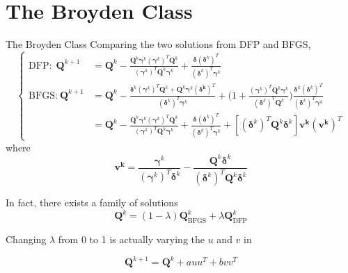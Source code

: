 \documentclass{beamer}
\begin{document}
\section{The Broyden Class}
\begin{frame}{The Broyden Class}
Comparing the two solutions from DFP and BFGS,
\begin{equation*}
\begin{cases}
    \textrm{DFP:}~~  \boldsymbol{Q}^{k+1}  &= \boldsymbol{Q}^k - 
    \frac{ \boldsymbol{Q}^k \boldsymbol{\gamma}^k (\boldsymbol{\gamma}^k)^T \boldsymbol{Q}^k }
    {(\boldsymbol{\gamma}^k)^T \boldsymbol{Q}^k \boldsymbol{\gamma}^k} 
    + \frac{\boldsymbol{\delta}(\boldsymbol{\delta}^k)^T}{(\boldsymbol{\delta}^k)^T \boldsymbol{\gamma}^k}\\

    \textrm{BFGS:}~     \boldsymbol{Q}^{k+1} &= \boldsymbol{Q}^k - 
    \frac{\boldsymbol{\delta}^k (\boldsymbol{\gamma}^k)^T \boldsymbol{Q}^k + \boldsymbol{Q}^k\boldsymbol{\gamma}^k (\boldsymbol{\delta^k})^T}
    {(\boldsymbol{\delta}^k)^T \boldsymbol{\gamma}^k} 
    + \bigg(1 + \frac{(\boldsymbol{\gamma}^k)^T \boldsymbol{Q}^k \boldsymbol{\gamma}^k}{(\boldsymbol{\delta}^k)^T \boldsymbol{Q}^k}\bigg)
    \frac{\boldsymbol{\delta}^k (\boldsymbol{\delta}^k)^T}{(\boldsymbol{\delta}^k)^T \boldsymbol{\gamma}^k}\\
    & = \boldsymbol{Q}^k - 
        \frac{ \boldsymbol{Q}^k \boldsymbol{\gamma}^k (\boldsymbol{\gamma}^k)^T \boldsymbol{Q}^k }
    {(\boldsymbol{\gamma}^k)^T \boldsymbol{Q}^k \boldsymbol{\gamma}^k} + 
    \frac{\boldsymbol{\delta}(\boldsymbol{\delta}^k)^T}{(\boldsymbol{\delta}^k)^T \boldsymbol{\gamma}^k}
    + [(\boldsymbol{\delta}^k)^T \boldsymbol{Q}^k  \boldsymbol{\delta}^k] \boldsymbol{v^k}(\boldsymbol{v^k})^T

\end{cases}
\end{equation*}
where
\begin{equation*}
    \boldsymbol{v^k} = \frac{\boldsymbol{\gamma}^k }{(\boldsymbol{\gamma}^k) ^T \boldsymbol{\delta}^k } -
    \frac{\boldsymbol{Q}^k\boldsymbol{\delta}^k }{(\boldsymbol{\delta}^k) ^T \boldsymbol{Q}^k\boldsymbol{\delta}^k }  
\end{equation*}

In fact, there exists a family of solutions
\begin{equation*}
    \boldsymbol{Q}^k = (1-\lambda) \boldsymbol{Q}^k_{\textrm{BFGS}} + \lambda \boldsymbol{Q}^k_{\textrm{DFP}}
\end{equation*}

Changing $\lambda$ from 0 to 1 is actually varying the $u$ and $v$ in 

\begin{equation*}
    \boldsymbol{Q}^{k+1} = \boldsymbol{Q}^{k} + a uu^T + bvv^T
\end{equation*}

\end{frame}
\end{document}
